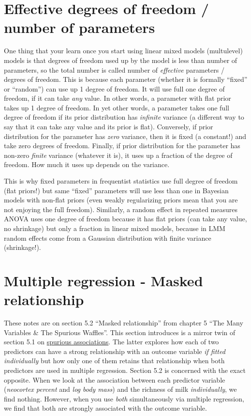 \documentclass[
]{book}
\begin{document}
\hypertarget{effective-degrees-of-freedom-number-of-parameters}{%
\chapter{Effective degrees of freedom / number of parameters}\label{effective-degrees-of-freedom-number-of-parameters}}

One thing that your learn once you start using linear mixed models (multulevel) models is that degrees of freedom used up by the model is less than number of parameters, so the total number is called number of \emph{effective} parameters / degrees of freedom. This is because each parameter (whether it is formally ``fixed'' or ``random'') can use up 1 degree of freedom. It will use full one degree of freedom, if it can take \emph{any} value. In other words, a parameter with flat prior takes up 1 degree of freedom. In yet other words, a parameter takes one full degree of freedom if its prior distribution has \emph{infinite} variance (a different way to say that it can take any value and its prior is flat). Conversely, if prior distribution for the parameter has \emph{zero} variance, then it is fixed (a constant!) and take zero degrees of freedom. Finally, if prior distribution for the parameter has non-zero \emph{finite} variance (whatever it is), it uses up a fraction of the degree of freedom. How much it uses up depends on the variance.

This is why fixed parameters in frequentist statistics use full degree of freedom (flat priors!) but same ``fixed'' parameters will use less than one in Bayesian models with non-flat priors (even weakly regularizing priors mean that you are not enjoying the full freedom). Similarly, a random effect in repeated measures ANOVA uses one degree of freedom because it has flat priors (can take any value, no shrinkage) but only a fraction in linear mixed models, because in LMM random effects come from a Gaussian distribution with finite variance (shrinkage!).

\hypertarget{multiple-regression---masked-relationship}{%
\chapter{Multiple regression - Masked relationship}\label{multiple-regression---masked-relationship}}

These notes are on section 5.2 ``Masked relationship'' from chapter 5 ``The Many Variables \& The Spurious Waffles''. This section introduces is a mirror twin of section 5.1 on \protect\hyperlink{spurious-association}{spurious associations}. The latter explores how each of two predictors can have a strong relationship with an outcome variable \emph{if fitted individually} but how only one of them retains that relationship when both predictors are used in multiple regression. Section 5.2 is concerned with the exact opposite. When we look at the association between each predictor variable (\emph{neocortex percent} and \emph{log body mass}) and the richness of milk \emph{individually}, we find nothing. However, when you use \emph{both} simultaneously via multiple regression, we find that both are strongly associated with the outcome variable.
\end{document}
